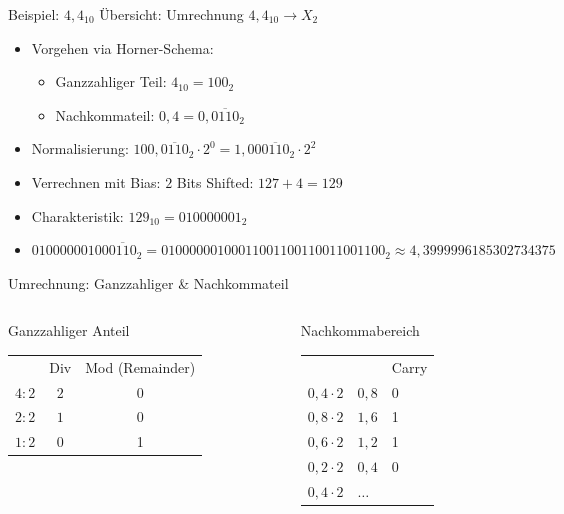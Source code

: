 \documentclass[12pt%
,xcolor=table
,aspectratio=169%
]{beamer}
\begin{document}
\begin{frame}{Beispiel: $4,4_{10}$}
Übersicht: Umrechnung $4,4_{10} \to X_2$
\begin{itemize}
	\item Vorgehen via Horner-Schema:
	\begin{itemize}
		\item Ganzzahliger Teil: $4_{10} = 100_2$
		\item Nachkommateil: $0,4 = 0, \overline{0110}_2$
	\end{itemize}
	\item Normalisierung: $100, \overline{0110}_2 \cdot 2^0 = 1,00 \overline{0110}_2 \cdot 2^2$
	\item Verrechnen mit Bias: $2$ Bits Shifted: $127+4 = 129$
	\item Charakteristik: $129_{10} = 010000001_2$
	\item $01000000100\overline{0110}_2 = 01000000100011001100110011001100_2 \approx 4,3999996185302734375$
\end{itemize}
\end{frame}

\begin{frame}{Umrechnung: Ganzzahliger \& Nachkommateil}
\begin{columns}[T] %
\begin{column}{.6\textwidth}
\vspace*{-1.cm}
\begin{center}
Ganzzahliger Anteil
\begin{table}[]
\begin{tabular}{ccc}
 & Div & Mod (Remainder) \\
$4 : 2$ & $2$ & 0 \\
$2 : 2$ & $1$ & 0 \\
$1 : 2$ & $0$ & 1 \\ 
\end{tabular}
\end{table}
\end{center}
\end{column}%
\hfill%
\begin{column}{.4\textwidth}
\vspace*{-.75cm}
\begin{center}
Nachkommabereich
\begin{table}[]
\begin{tabular}{lll}
 &  & Carry \\
$0,4 \cdot 2$ & $0,8$ & 0 \\
$0,8 \cdot 2$ & $1,6$ & 1 \\
$0,6 \cdot 2$ & $1,2$ & 1 \\
$0,2 \cdot 2$ & $0,4$ & 0 \\
$0,4 \cdot 2$ & $\ldots$ & 
\end{tabular}
\end{table}
\end{center}
\end{column}%
\end{columns}
\end{frame}
\end{document}
